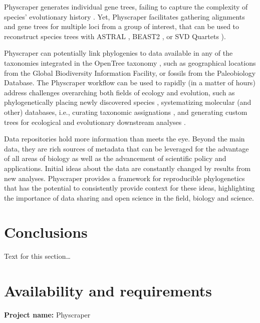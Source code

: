 \documentclass{bmcart}
\begin{document}
Physcraper generates individual gene trees, failing to capture the complexity of
species' evolutionary history \cite{song2012resolving}. Yet, Physcraper facilitates
gathering alignments and gene trees for multiple loci from a group of interest,
that can be used to reconstruct species trees with ASTRAL \cite{mirarab2014astral},
BEAST2 \cite{bouckaert2019beast}, or SVD Quartets \cite{chifman2014quartet}).

Physcraper can potentially link phylogenies to data available in any of the
taxonomies integrated in the OpenTree taxonomy \cite{rees2017automated}, such as
geographical locations from the Global Biodiversity Information Facility, or
fossils from the Paleobiology Database.
The Physcraper workflow can be used to rapidly (in a matter of hours)
address challenges overarching both fields of ecology and evolution, such as
phylogenetically placing newly discovered species \cite{webb2010biodiversity},
systematizing molecular (and other) databases, i.e., curating taxonomic assignations
\cite{san2010molecular},
and generating custom trees for ecological \cite{helmus2012phylogenetic} and
evolutionary downstream analyses \cite{stoltzfus2013phylotastic}.

Data repositories hold more information than meets the eye.
Beyond the main data, they are rich sources of metadata that can be leveraged
for the advantage of all areas of biology as well as the advancement of scientific
policy and applications.
Initial ideas about the data are constantly changed by results from new analyses.
Physcraper provides a framework for reproducible phylogenetics that has the
potential to consistently provide context for these ideas, highlighting the
importance of data sharing and open science in the field, biology and science.


\section*{Conclusions}
Text for this section\ldots

\section*{Availability and requirements}

\textbf{Project name:} Physcraper
\end{document}
